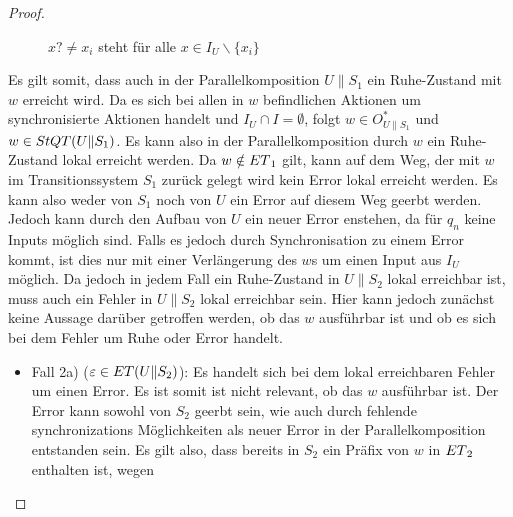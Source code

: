 \begin{proof}
\begin{itemize}
\begin{figure} [h!tbp]
\begin{center}
        \caption{$x?\neq x_i$ steht für alle $x\in I_U\backslash\{x_i\}$}
        \label{UohneEmitI}
      \end{center}
      \end{figure}
      Es gilt somit, dass auch in der Parallelkomposition $U\|S_1$ ein
      Ruhe-Zustand mit $w$ erreicht wird. Da es sich bei allen in $w$
      befindlichen Aktionen um synchronisierte Aktionen handelt und $I_U\cap
      I=\emptyset$, folgt $w\in O_{U\|S_1}^*$ und $w\in StQT{}(U\|S_1)$. Es
      kann also in der Parallelkomposition durch $w$ ein Ruhe-Zustand lokal
      erreicht werden. Da $w\notin ET{}_1$ gilt, kann auf dem Weg, der mit
      $w$ im Transitionssystem $S_1$ zurück gelegt wird kein Error lokal
      erreicht werden. Es kann also weder von $S_1$ noch von $U$ ein Error auf
      diesem Weg geerbt werden. Jedoch kann durch den Aufbau von $U$ ein neuer
      Error enstehen, da für $q_n$ keine Inputs möglich sind. Falls es jedoch
      durch Synchronisation zu einem Error kommt, ist dies nur mit einer
      Verlängerung des $w$s um einen Input aus $I_U$ möglich. Da jedoch in
      jedem Fall ein Ruhe-Zustand in $U\|S_2$ lokal erreichbar ist, muss auch ein
      Fehler in $U\|S_2$ lokal erreichbar sein. Hier kann jedoch zunächst keine
      Aussage darüber getroffen werden, ob das $w$ ausführbar ist und ob es
      sich bei dem Fehler um Ruhe oder Error handelt.
      \begin{itemize}
        \item Fall 2a) ($\varepsilon\in ET{}(U\|S_2)$): Es handelt sich bei
          dem lokal erreichbaren Fehler um einen Error. Es ist somit ist nicht
          relevant, ob
          das $w$ ausführbar ist. Der Error kann sowohl von $S_2$ geerbt sein,
          wie auch durch fehlende synchronizations Möglichkeiten als neuer
          Error in der Parallelkomposition entstanden sein. Es gilt also, dass
          bereits in $S_2$ ein Präfix von $w$ in $ET{}_2$ enthalten ist, wegen

\end{itemize}
\end{itemize}
\end{proof}
